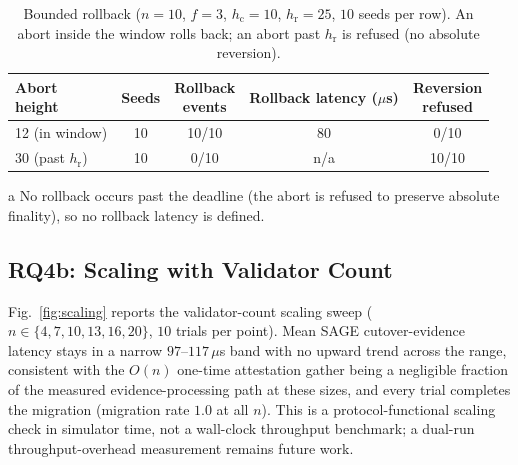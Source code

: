 \documentclass[journal]{IEEEtran}
\begin{document}
\begin{table}[t]
\centering
\begin{threeparttable}
\caption{Bounded rollback
($n{=}10$, $f{=}3$, $h_{\mathrm{c}}{=}10$, $h_{\mathrm{r}}{=}25$, $10$ seeds per row). An abort
inside the window rolls back; an abort past $h_{\mathrm{r}}$ is refused (no absolute reversion).}
\label{tab:rollback}
\setlength{\tabcolsep}{4pt}
\renewcommand{\arraystretch}{1.2}
\footnotesize
\begin{tabular}{lcccc}
\toprule
\makecell{Abort\\height} & Seeds & \makecell{Rollback\\events} & \makecell{Rollback\\latency ($\mu$s)} & \makecell{Reversion\\refused} \\
\midrule
12 (in window)            & 10 & 10/10 & 80           & 0/10  \\
30 (past $h_{\mathrm{r}}$) & 10 & 0/10  & n/a\tnote{a} & 10/10 \\
\bottomrule
\end{tabular}
\begin{tablenotes}\footnotesize
\item[a] No rollback occurs past the deadline (the abort is refused to preserve absolute
finality), so no rollback latency is defined.
\end{tablenotes}
\end{threeparttable}
\end{table}

\subsection{RQ4b: Scaling with Validator Count}
Fig.~\ref{fig:scaling} reports the validator-count scaling sweep
($n\in\{4,7,10,13,16,20\}$, $10$ trials per point). Mean
SAGE cutover-evidence latency stays in a narrow $97$--$117\,\mu$s band with no upward trend across
the range, consistent with the $O(n)$ one-time attestation gather being a negligible fraction of
the measured evidence-processing path at these sizes, and every trial completes the migration
(migration rate $1.0$ at all $n$). This is a protocol-functional scaling check in simulator time,
not a wall-clock throughput benchmark; a dual-run throughput-overhead measurement
remains future work.
\end{document}
